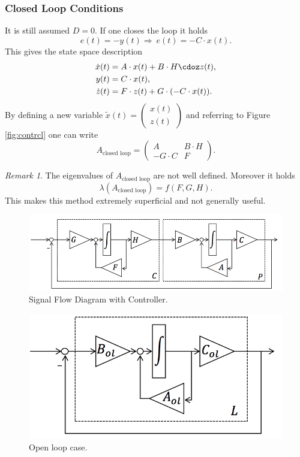 \documentclass[a4paper,12 pt]{article}
\numberwithin{equation}{section}
\theoremstyle{definition}
\theoremstyle{remark}
\newtheorem*{bmk}{Remark}
\theoremstyle{definition}
\theoremstyle{definition}
\theoremstyle{definition}
\theoremstyle{remark}
\begin{document}
\subsubsection*{Closed Loop Conditions}
It is still assumed $D=0$. If one closes the loop it holds
\begin{equation}
e(t)=-y(t) \Rightarrow \ e(t)=-C\cdot x(t).
\end{equation}
This gives the state space description
\begin{equation}
\begin{split}
\dot{x}(t)&=A\cdot x(t)+B\cdot H\cdoz z(t),\\
y(t)&=C\cdot x(t),\\
\dot{z}(t)&=F\cdot z(t)+G\cdot (-C\cdot x(t)).
\end{split}
\end{equation}
By defining a new variable $\tilde{x}(t)=\begin{pmatrix} x(t)\\z(t) \end{pmatrix}$ and referring to Figure \ref{fig:contrcl} one can write
\begin{equation}
A_{\text{closed loop}}=\begin{pmatrix} A & B\cdot H \\
-G\cdot C&F
\end{pmatrix}.
\end{equation}
\begin{bmk}
The eigenvalues of $A_{\text{closed loop}}$ are not well defined. Moreover it holds
\begin{equation}
\lambda(A_{\text{closed loop}})=f(F,G,H).
\end{equation}
This makes this method extremely superficial and not generally useful.
\end{bmk}

\begin{figure}[h!]
\begin{center}
\includegraphics[width=0.7\columnwidth]{statecontr.png}
\caption{Signal Flow Diagram with Controller.}
\label{fig:statecontr}
\end{center}
\end{figure}

\begin{figure}[h!]
\begin{center}
\includegraphics[width=0.4\columnwidth]{controp.png}
\caption{Open loop case.}
\label{fig:controp}
\end{center}
\end{figure}
\end{document}
